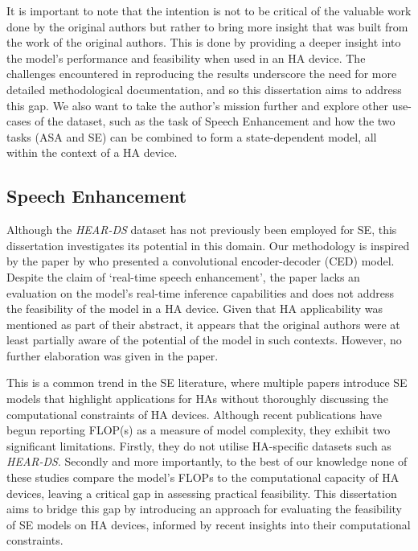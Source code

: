 \documentclass[logo,bsc,singlespacing,parskip,online]{infthesis}
\newcommand{\heards}{\textit{HEAR-DS}\xspace}
\begin{document}
It is important to note that the intention is not to 
be critical of the valuable work done by the original authors 
but rather to bring more insight that was built from the work of the original authors.
This is done by providing a deeper insight into the model's performance 
and feasibility when used in an HA device. The challenges encountered 
in reproducing the results underscore the need for more 
detailed methodological documentation, and so this dissertation aims 
to address this gap. We also want to take the author's 
mission further and explore other use-cases of the dataset, 
such as the task of Speech Enhancement and how the two tasks 
(ASA and SE) can be combined to form a state-dependent model,
all within the context of a HA device.
\newpage

\subsection{Speech Enhancement}
Although the \heards dataset has not previously been employed 
for SE, this dissertation investigates its potential in this domain.
Our methodology is inspired by the paper by \citet{tan18_interspeech}
who presented a convolutional encoder-decoder (CED) model.
Despite the claim of `real-time speech enhancement', the paper 
lacks an evaluation on the model's real-time inference capabilities 
and does not address the feasibility of the model in a HA device. 
Given that HA applicability was mentioned as part of their abstract,
it appears that the original authors were at least partially 
aware of the potential of the model in such contexts. However, 
no further elaboration was given in the paper. 

This is a common trend in the SE literature, where multiple papers
introduce SE models that highlight applications for HAs without 
thoroughly discussing the computational constraints of HA devices. 
Although recent publications \citep{DuSpiking2024,Sach2023EffCRNAE,Wang2025ZipEnhancerDD} 
have begun reporting FLOP(s) as a measure of model complexity,
they exhibit two significant limitations. Firstly, they do not utilise HA-specific datasets 
such as \heards. Secondly and more importantly, to the best of our knowledge
none of these studies compare the model's FLOPs to the computational capacity 
of HA devices, leaving a critical gap in assessing practical feasibility. 
This dissertation aims to bridge this gap by introducing an approach 
for evaluating the feasibility of SE models on HA devices, informed by 
recent insights into their computational constraints.
\end{document}
